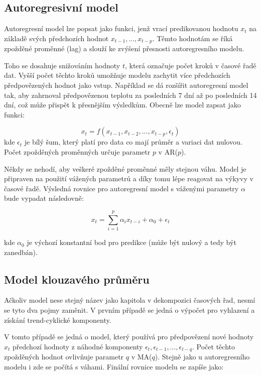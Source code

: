 \documentclass[FM,BP,fonts]{tulthesis}
\begin{document}
\subsection{Autoregresivní model}
Autoregresní model lze popsat jako funkci, jenž vrací predikovanou hodnotu $x_t$ na základě svých předchozích hodnot $x_{t-1}, ...,  x_{t-p}$. Těmto hodnotám se říká zpožděné proměnné (lag) a slouží ke zvýšení přesnosti autoregresního modelu. 

Toho se dosahuje snižováním hodnoty $t$, která označuje počet kroků v časové řadě dat. Vyšší počet těchto kroků umožňuje modelu zachytit více předchozích předpovězených hodnot jako vstup. Například se dá rozšířit autoregresní model tak, aby zahrnoval předpovězenou teplotu za posledních 7 dní až po posledních 14 dní, což může přispět k přesnějším výsledkům. \cite{amazon} Obecně lze model zapsat jako funkci: 

\begin{equation}
	x_t = f(x_{t-1}, x_{t-2}, ..., x_{t-p}, \epsilon_t)
\end{equation}
kde $\epsilon_t$ je bílý šum, který platí pro data co mají průměr a variaci dat nulovou. Počet zpožděných proměnných určuje parametr $p$ v AR($p$).

Někdy se nehodí, aby veškeré zpožděné proměnné měly stejnou váhu. Model je připraven na použití vážených parametrů a díky tomu lépe reagovat na výkyvy v časové řadě. Výsledná rovnice pro autoregresní model s váženými parametry $\alpha$ bude vypadat následovně: 

\begin{equation}
	x_t =    \sum_{i=1}^{p}\alpha_ix_{t-i} + \alpha_0 + \epsilon_t
\end{equation}

kde $\alpha_0$  je výchozí konstantní bod pro predikce (může být nulový a tedy být zanedbán). 

\subsection{Model klouzavého průměru}
Ačkoliv model nese stejný název jako kapitola v dekompozici časových řad, nesmí se tyto dva pojmy zaměnit. V prvním případě se jedná o výpočet pro vyhlazení a získání trend-cyklické komponenty. 

V tomto případě se jedná o model, který používá pro předpovězení nové hodnoty $x_t$ předchozí hodnoty z náhodné komponenty $\epsilon_t, \epsilon_{t-1}, ..., \epsilon_{t-q}$. Počet těchto zpožděných hodnot ovlivňuje parametr $q$ v MA($q$). Stejně jako u autoregresního modelu i zde se počítá s váhami. Finální rovnice modelu se zapíše jako: 
\end{document}
